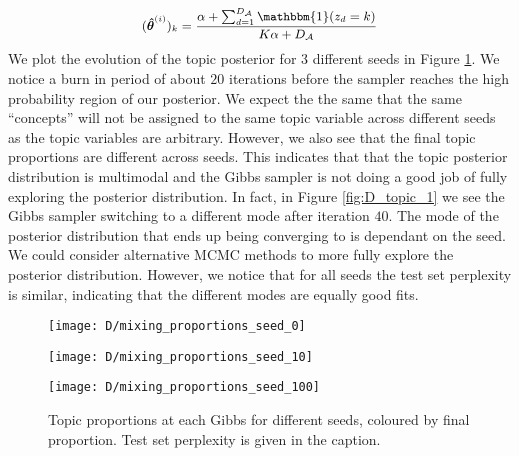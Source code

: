 \documentclass[11pt]{article}
\begin{document}
\begin{equation}
    \small
    \begin{aligned}
        (\boldsymbol{\hat \theta}^{(i)})_k = \frac{\alpha + \sum_{d=1}^{D_{\mathcal{A}}} \mathbbm{1}(z_{d} = k)}{K \alpha + D_{\mathcal{A}}}
    \end{aligned}
    \label{eq:D_topic_posterior}
\end{equation}
We plot the evolution of the topic posterior for 3 different seeds in Figure \ref{fig:D_topic_proportions}. We notice a burn in period of about $20$ iterations before the sampler reaches the high probability region of our posterior. We expect the the same that the same ``concepts'' will not be assigned to the same topic variable across different seeds as the topic variables are arbitrary. 
However, we also see that the final topic proportions are different across seeds. This indicates that that the topic posterior distribution is multimodal and the Gibbs sampler is not doing a good job of fully exploring the posterior distribution. In fact, in Figure \ref{fig:D_topic_1} we see the Gibbs sampler switching to a different mode after iteration $40$. The mode of the posterior distribution that ends up being converging to is dependant on the seed. We could consider alternative MCMC methods to more fully explore the posterior distribution. However, we notice that for all seeds the test set perplexity is similar, indicating that the different modes are equally good fits.
\begin{figure}
    \centering
    \begin{minipage}{0.32\textwidth}
        \centering
        \texttt{[image: D/mixing\_proportions\_seed\_0]}
        \label{fig:D_topic_0}
    \end{minipage} 
    \begin{minipage}{0.32\textwidth}
        \centering
        \texttt{[image: D/mixing\_proportions\_seed\_10]}
        \label{fig:D_topic_1}
    \end{minipage}
    \begin{minipage}{0.32\textwidth}
        \centering
        \texttt{[image: D/mixing\_proportions\_seed\_100]}
        \label{fig:D_topic_2}
    \end{minipage}
    \caption{Topic proportions at each Gibbs for different seeds, coloured by final proportion. Test set perplexity is given in the caption.}
    \label{fig:D_topic_proportions}
\end{figure}
\end{document}
